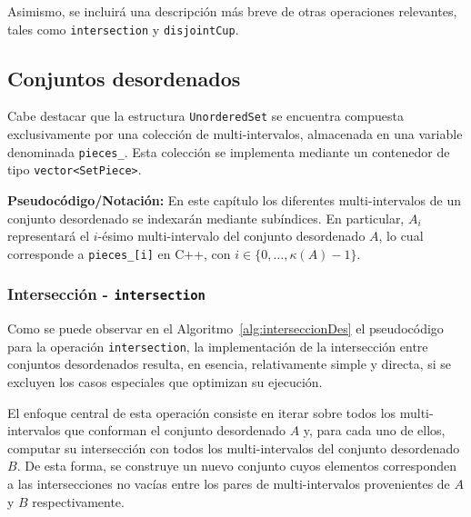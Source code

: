 Asimismo, se incluirá una descripción más breve de otras operaciones relevantes, tales como \texttt{intersection} y \texttt{disjointCup}.

\subsection{Conjuntos desordenados}\label{sec:conjs-des}

Cabe destacar que la estructura \texttt{UnorderedSet} se encuentra compuesta exclusivamente por una colección de multi-intervalos, almacenada en una variable denominada \texttt{pieces\_}. Esta colección se implementa mediante un contenedor de tipo \texttt{vector<SetPiece>}.

\textbf{Pseudocódigo/Notación:} En este capítulo los diferentes multi-intervalos de un conjunto desordenado se indexarán mediante subíndices. En particular, $A_i$ representará el $i$-ésimo multi-intervalo del conjunto desordenado $A$, lo cual corresponde a \texttt{pieces\_[i]} en C++, con $i \in \{0, \ldots, \kappa(A)-1\}$.

\subsubsection{Intersección - \texttt{intersection}}

Como se puede observar en el Algoritmo~\ref{alg:interseccionDes} el pseudocódigo para la operación \texttt{intersection}, la implementación de la intersección entre conjuntos desordenados resulta, en esencia, relativamente simple y directa, si se excluyen los casos especiales que optimizan su ejecución. 

El enfoque central de esta operación consiste en iterar sobre todos los multi-intervalos que conforman el conjunto desordenado $A$ y, para cada uno de ellos, computar su intersección con todos los multi-intervalos del conjunto desordenado $B$. De esta forma, se construye un nuevo conjunto cuyos elementos corresponden a las intersecciones no vacías entre los pares de multi-intervalos provenientes de $A$ y $B$ respectivamente.


